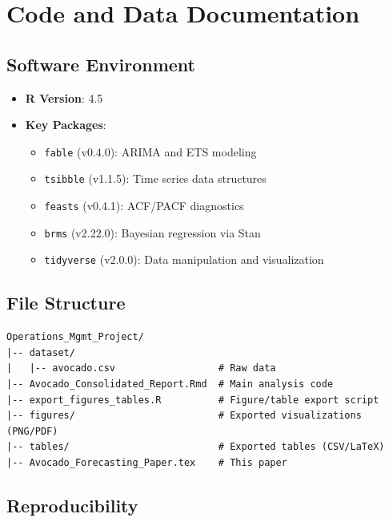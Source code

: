 \documentclass[12pt]{article}
\begin{document}
\newpage

\section{Code and Data Documentation}
\label{sec:code}

\subsection{Software Environment}

\begin{itemize}
    \item \textbf{R Version}: 4.5
    \item \textbf{Key Packages}:
    \begin{itemize}
        \item \texttt{fable} (v0.4.0): ARIMA and ETS modeling
        \item \texttt{tsibble} (v1.1.5): Time series data structures
        \item \texttt{feasts} (v0.4.1): ACF/PACF diagnostics
        \item \texttt{brms} (v2.22.0): Bayesian regression via Stan
        \item \texttt{tidyverse} (v2.0.0): Data manipulation and visualization
    \end{itemize}
\end{itemize}

\subsection{File Structure}

\begin{verbatim}
Operations_Mgmt_Project/
|-- dataset/
|   |-- avocado.csv                  # Raw data
|-- Avocado_Consolidated_Report.Rmd  # Main analysis code
|-- export_figures_tables.R          # Figure/table export script
|-- figures/                         # Exported visualizations (PNG/PDF)
|-- tables/                          # Exported tables (CSV/LaTeX)
|-- Avocado_Forecasting_Paper.tex    # This paper
\end{verbatim}

\subsection{Reproducibility}
\end{document}

